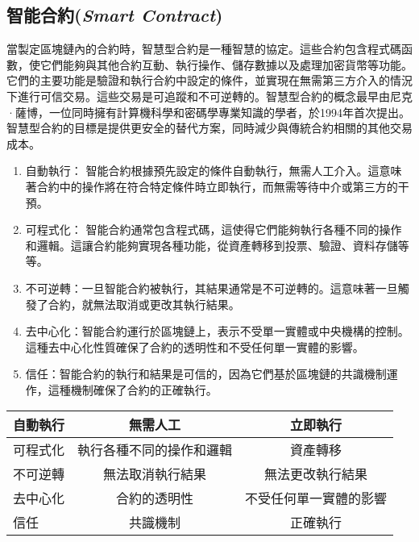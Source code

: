\subsection{智能合約(\textit{Smart Contract})}
當製定區塊鏈內的合約時，智慧型合約是一種智慧的協定。這些合約包含程式碼函數，使它們能夠與其他合約互動、執行操作、儲存數據以及處理加密貨幣等功能。它們的主要功能是驗證和執行合約中設定的條件，並實現在無需第三方介入的情況下進行可信交易。這些交易是可追蹤和不可逆轉的。智慧型合約的概念最早由尼克·薩博，一位同時擁有計算機科學和密碼學專業知識的學者，於1994年首次提出。智慧型合約的目標是提供更安全的替代方案，同時減少與傳統合約相關的其他交易成本。
\begin{enumerate}
\item 自動執行：
智能合約根據預先設定的條件自動執行，無需人工介入。這意味著合約中的操作將在符合特定條件時立即執行，而無需等待中介或第三方的干預。
\item 可程式化：
智能合約通常包含程式碼，這使得它們能夠執行各種不同的操作和邏輯。這讓合約能夠實現各種功能，從資產轉移到投票、驗證、資料存儲等等。
\item 不可逆轉：一旦智能合約被執行，其結果通常是不可逆轉的。這意味著一旦觸發了合約，就無法取消或更改其執行結果。
\item 去中心化：智能合約運行於區塊鏈上，表示不受單一實體或中央機構的控制。這種去中心化性質確保了合約的透明性和不受任何單一實體的影響。
\item 信任：智能合約的執行和結果是可信的，因為它們基於區塊鏈的共識機制運作，這種機制確保了合約的正確執行。
\end{enumerate}
\begin{center}
\begin{tabular}{l|cc}  
\hline
  自動執行	& 無需人工	& 立即執行		\\\hline  
  可程式化    & 執行各種不同的操作和邏輯& 資產轉移\\\hline
  不可逆轉 	& 無法取消執行結果    	& 無法更改執行結果\\\hline
  去中心化    & 合約的透明性&不受任何單一實體的影響\\\hline
  信任       & 共識機制    &正確執行\\\hline
\end{tabular}
\end{center}
